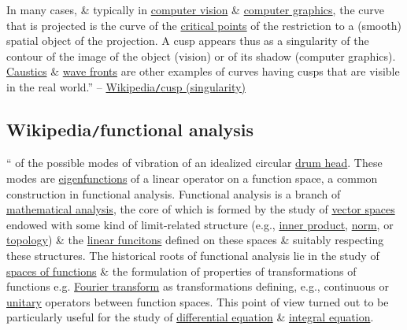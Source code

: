 \documentclass{article}
\begin{document}
In many cases, \& typically in \href{https://en.wikipedia.org/wiki/Computer_vision}{computer vision} \& \href{https://en.wikipedia.org/wiki/Computer_graphics}{computer graphics}, the curve that is projected is the curve of the \href{https://en.wikipedia.org/wiki/Critical_point_(mathematics)}{critical points} of the restriction to a (smooth) spatial object of the projection. A cusp appears thus as a singularity of the contour of the image of the object (vision) or of its shadow (computer graphics). \href{https://en.wikipedia.org/wiki/Caustic_(mathematics)}{Caustics} \& \href{https://en.wikipedia.org/wiki/Wave_front}{wave fronts} are other examples of curves having cusps that are visible in the real world.'' -- \href{https://en.wikipedia.org/wiki/Cusp_(singularity)}{Wikipedia{\tt/}cusp (singularity)}


\subsection{Wikipedia{\tt/}functional analysis}
``{ of the possible modes of vibration of an idealized circular \href{https://en.wikipedia.org/wiki/Drum_head}{drum head}. These modes are \href{https://en.wikipedia.org/wiki/Eigenfunction}{eigenfunctions} of a linear operator on a function space, a common construction in functional analysis.} {\sf Functional analysis} is a branch of \href{https://en.wikipedia.org/wiki/Mathematical_analysis}{mathematical analysis}, the core of which is formed by the study of \href{https://en.wikipedia.org/wiki/Vector_space}{vector spaces} endowed with some kind of limit-related structure (e.g., \href{https://en.wikipedia.org/wiki/Inner_product_space#Definition}{inner product}, \href{https://en.wikipedia.org/wiki/Norm_(mathematics)#Definition}{norm}, or \href{https://en.wikipedia.org/wiki/Topological_space#Definition}{topology}) \& the \href{https://en.wikipedia.org/wiki/Linear_transformation}{linear funcitons} defined on these spaces \& suitably respecting these structures. The historical roots of functional analysis lie in the study of \href{https://en.wikipedia.org/wiki/Function_space}{spaces of functions} \& the formulation of properties of transformations of functions e.g. \href{https://en.wikipedia.org/wiki/Fourier_transform}{Fourier transform} as transformations defining, e.g., continuous or \href{https://en.wikipedia.org/wiki/Unitary_operator}{unitary} operators between function spaces. This point of view turned out to be particularly useful for the study of \href{https://en.wikipedia.org/wiki/Differential_equations}{differential equation} \& \href{https://en.wikipedia.org/wiki/Integral_equations}{integral equation}.
\end{document}
